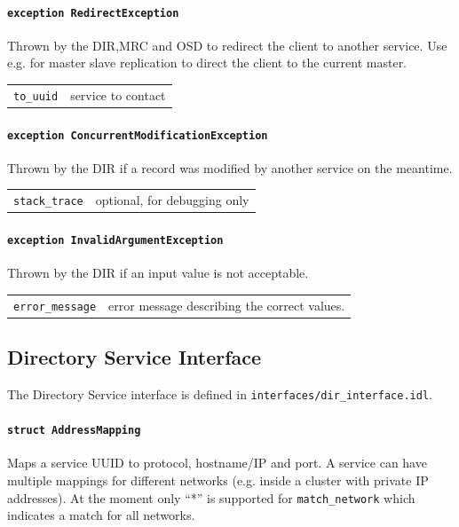 \paragraph{\texttt{exception RedirectException}}
Thrown by the DIR,MRC and OSD to redirect the client to another service. Use e.g. for master slave replication to direct the client to the current master.

\begin{tabularx}{\textwidth}{lX}
 \texttt{to\_uuid} & service to contact\\
\end{tabularx}


\paragraph{\texttt{exception ConcurrentModificationException}}
Thrown by the DIR if a record was modified by another service on the meantime.

\begin{tabularx}{\textwidth}{lX}
 \texttt{stack\_trace} & optional, for debugging only
\end{tabularx}


\paragraph{\texttt{exception InvalidArgumentException}}
Thrown by the DIR if an input value is not acceptable.

\begin{tabularx}{\textwidth}{lX}
 \texttt{error\_message} & error message describing the correct values.
\end{tabularx}


\subsection{Directory Service Interface}

The Directory Service interface is defined in \texttt{interfaces/dir\_interface.idl}.

\paragraph{\texttt{struct AddressMapping}}
Maps a service UUID to protocol, hostname/IP and port. A service can have multiple mappings for different networks (e.g. inside a cluster with private IP addresses). At the moment only ``*'' is supported for \texttt{match\_network} which indicates a match for all networks.

